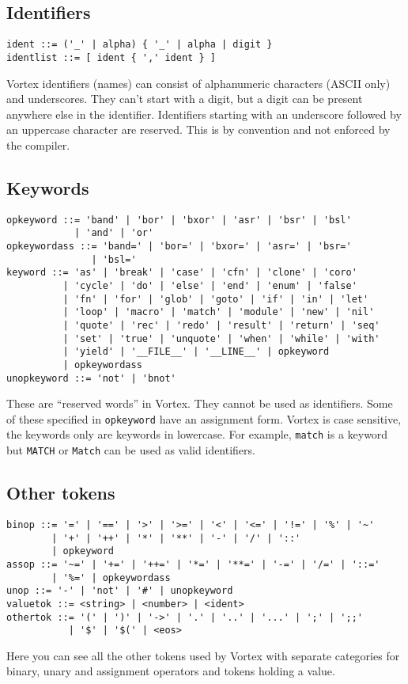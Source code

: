 \documentclass{article}
\begin{document}
\subsection{Identifiers}
\begin{lstlisting}[language=bnf]
ident ::= ('_' | alpha) { '_' | alpha | digit }
identlist ::= [ ident { ',' ident } ]
\end{lstlisting}
Vortex identifiers (names) can consist of alphanumeric characters (ASCII only)
and underscores. They can't start with a digit, but a digit can be present
anywhere else in the identifier. Identifiers starting with an underscore
followed by an uppercase character are reserved. This is by convention and
not enforced by the compiler.
\subsection{Keywords}
\begin{lstlisting}[language=bnf]
opkeyword ::= 'band' | 'bor' | 'bxor' | 'asr' | 'bsr' | 'bsl'
            | 'and' | 'or'
opkeywordass ::= 'band=' | 'bor=' | 'bxor=' | 'asr=' | 'bsr='
               | 'bsl='
keyword ::= 'as' | 'break' | 'case' | 'cfn' | 'clone' | 'coro'
          | 'cycle' | 'do' | 'else' | 'end' | 'enum' | 'false'
          | 'fn' | 'for' | 'glob' | 'goto' | 'if' | 'in' | 'let'
          | 'loop' | 'macro' | 'match' | 'module' | 'new' | 'nil'
          | 'quote' | 'rec' | 'redo' | 'result' | 'return' | 'seq'
          | 'set' | 'true' | 'unquote' | 'when' | 'while' | 'with'
          | 'yield' | '__FILE__' | '__LINE__' | opkeyword
          | opkeywordass
unopkeyword ::= 'not' | 'bnot'
\end{lstlisting}
These are \enquote{reserved words} in Vortex. They cannot be used as
identifiers. Some of these specified in \verb|opkeyword| have an assignment
form. Vortex is case sensitive, the keywords only are keywords in lowercase.
For example, \verb|match| is a keyword but \verb|MATCH| or \verb|Match| can
be used as valid identifiers.
\subsection{Other tokens}
\begin{lstlisting}[language=bnf]
binop ::= '=' | '==' | '>' | '>=' | '<' | '<=' | '!=' | '%' | '~'
        | '+' | '++' | '*' | '**' | '-' | '/' | '::'
        | opkeyword
assop ::= '~=' | '+=' | '++=' | '*=' | '**=' | '-=' | '/=' | '::='
        | '%=' | opkeywordass
unop ::= '-' | 'not' | '#' | unopkeyword
valuetok ::= <string> | <number> | <ident>
othertok ::= '(' | ')' | '->' | '.' | '..' | '...' | ';' | ';;'
           | '$' | '$(' | <eos>
\end{lstlisting}
Here you can see all the other tokens used by Vortex with separate categories
for binary, unary and assignment operators and tokens holding a value.
\end{document}

